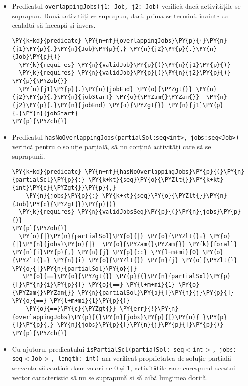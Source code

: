 \begin{itemize}
    \item 
    Predicatul \texttt{overlappingJobs(j1: Job, j2: Job)} verifică dacă activitățile se suprapun. Două activități se suprapun, dacă prima se termină înainte ca cealaltă să înceapă și invers. \begin{Verbatim}[commandchars=\\\{\}, fontsize=\footnotesize]
\PY{k+kd}{predicate} \PY{n+nf}{overlappingJobs}\PY{p}{(}\PY{n}{j1}\PY{p}{:}\PY{n}{Job}\PY{p}{,} \PY{n}{j2}\PY{p}{:}\PY{n}{Job}\PY{p}{)}
  \PY{k}{requires} \PY{n}{validJob}\PY{p}{(}\PY{n}{j1}\PY{p}{)}
  \PY{k}{requires} \PY{n}{validJob}\PY{p}{(}\PY{n}{j2}\PY{p}{)}
\PY{p}{\PYZob{}}
  \PY{n}{j1}\PY{p}{.}\PY{n}{jobEnd} \PY{o}{\PYZgt{}} \PY{n}{j2}\PY{p}{.}\PY{n}{jobStart} \PY{o}{\PYZam{}\PYZam{}}  \PY{n}{j2}\PY{p}{.}\PY{n}{jobEnd} \PY{o}{\PYZgt{}} \PY{n}{j1}\PY{p}{.}\PY{n}{jobStart} 
\PY{p}{\PYZcb{}}
\end{Verbatim}
    \item 
    Predicatul \texttt{hasNoOverlappingJobs(partialSol:seq<int>, jobs:seq<Job>)} verifică pentru o soluție parțială, să nu conțină activități care să se suprapună.  
\begin{Verbatim}[commandchars=\\\{\}, fontsize=\footnotesize]
\PY{k+kd}{predicate} \PY{n+nf}{hasNoOverlappingJobs}\PY{p}{(}\PY{n}{partialSol}\PY{p}{:} \PY{k+kt}{seq}\PY{o}{\PYZlt{}}\PY{k+kt}{int}\PY{o}{\PYZgt{}}\PY{p}{,}
    \PY{n}{jobs}\PY{p}{:} \PY{k+kt}{seq}\PY{o}{\PYZlt{}}\PY{n}{Job}\PY{o}{\PYZgt{}}\PY{p}{)}
  \PY{k}{requires} \PY{n}{validJobsSeq}\PY{p}{(}\PY{n}{jobs}\PY{p}{)}
\PY{p}{\PYZob{}}
  \PY{o}{|}\PY{n}{partialSol}\PY{o}{|} \PY{o}{\PYZlt{}=} \PY{o}{|}\PY{n}{jobs}\PY{o}{|}  \PY{o}{\PYZam{}\PYZam{}} \PY{k}{forall} \PY{n}{i}\PY{p}{,} \PY{n}{j} \PY{p}{::} \PY{l+m+mi}{0} \PY{o}{\PYZlt{}=} \PY{n}{i} \PY{o}{\PYZlt{}} \PY{n}{j} \PY{o}{\PYZlt{}} \PY{o}{|}\PY{n}{partialSol}\PY{o}{|}
   \PY{o}{==}\PY{o}{\PYZgt{}} \PY{p}{(}\PY{n}{partialSol}\PY{p}{[}\PY{n}{i}\PY{p}{]} \PY{o}{==} \PY{l+m+mi}{1} \PY{o}{\PYZam{}\PYZam{}} \PY{n}{partialSol}\PY{p}{[}\PY{n}{j}\PY{p}{]} \PY{o}{==} \PY{l+m+mi}{1}\PY{p}{)}
    \PY{o}{==}\PY{o}{\PYZgt{}} \PY{err}{!}\PY{n}{overlappingJobs}\PY{p}{(}\PY{n}{jobs}\PY{p}{[}\PY{n}{i}\PY{p}{]}\PY{p}{,} \PY{n}{jobs}\PY{p}{[}\PY{n}{j}\PY{p}{]}\PY{p}{)}
\PY{p}{\PYZcb{}} 
\end{Verbatim}
    \item 
    Cu ajutorul predicatului \texttt{isPartialSol(partialSol: seq$<$int$>$, jobs: seq$<$Job$>$, length: int)} am verificat proprietatea de soluție parțială: secvența să conțină doar valori de 0 și 1, activitățile care corespund acestui vector caracteristic să nu se suprapună și să aibă lungimea dorită. 

\end{itemize}
